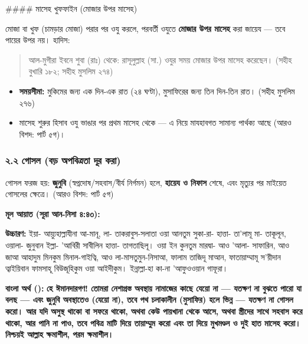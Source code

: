 \#\#\#\# মাসেহ খুফফাইন (মোজার উপর মাসেহ)

মোজা বা খুফ (চামড়ার মোজা) পরার পর ওযু করলে, পরবর্তী ওযুতে \textbf{মোজার উপর মাসেহ} করা জায়েয — তবে পায়ের উপর নয়। হাদিস:

\begin{quote}
আল-মুগীরা ইবনে শুবা (রাঃ) থেকে: রাসূলুল্লাহ (সা.) ওযুর সময় মোজার উপর মাসেহ করেছেন। (সহীহ বুখারি ১৮২; সহীহ মুসলিম ২৭৪)
\end{quote}

\begin{itemize}
\item \textbf{সময়সীমা:} মুকিমের জন্য এক দিন-এক রাত (২৪ ঘণ্টা), মুসাফিরের জন্য তিন দিন-তিন রাত। (সহীহ মুসলিম ২৭৬)
\item মাসেহ শুরুর হিসাব ওযু ভাঙার পর প্রথম মাসেহ থেকে — এ নিয়ে মাযহাবগত সামান্য পার্থক্য আছে (আরও বিশদ: পার্ট ৫গ)।
\end{itemize}
\subsubsection*{২.২ গোসল (বড় অপবিত্রতা দূর করা)}

গোসল ফরজ হয়: \textbf{জুনুবি} (স্বপ্নদোষ/সহবাস/বীর্য নির্গমন) হলে, \textbf{হায়েয ও নিফাস} শেষে, এবং মৃত্যুর পর মাইয়েত গোসলের ক্ষেত্রে। (আরও বিশদ: পার্ট ৫গ)

\textbf{মূল আয়াত (সূরা আন-নিসা ৪:৪৩):}

\begin{center}\end{center}

\textbf{উচ্চারণ:} ইয়া- আয়্যুহাল্লাযীনা আ-মানূ, লা- তাকরাবুস-সলাতা ওয়া আনতুম সুকা-রা- হাত্তা- তা'লামূ মা- তাকূলূন, ওয়ালা- জুনুবান ইল্লা- 'আবিরী সাবীলিন হাত্তা- তাগতাছিলূ। ওয়া ইন কুনতুম মারদ্বা- আও 'আলা- সাফারিন, আও জাআ আহাদুম মিনকুম মিনাল-গাইত্বি, আও লা-মাসতুমুন-নিসাআ, ফালাম তাজিদূ মাআন, ফাতায়াম্মামূ স'য়ীদান ত্বাইয়িবান ফামসাহূ বিউজূহিকুম ওয়া আইদীকুম। ইন্নাল্লা-হা কা-না 'আফুওওয়ান গাফূরা।

\textbf{বাংলা অর্থ ():}
\textbf{হে ঈমানদারগণ! তোমরা নেশাগ্রস্ত অবস্থায় নামাজের কাছে যেয়ো না — যতক্ষণ না বুঝতে পারো যা বলছ — এবং জুনুবি অবস্থাতেও (যেয়ো না), তবে পথ চলাকালীন (মুসাফির) হলে ভিন্ন — যতক্ষণ না গোসল করো। আর যদি অসুস্থ থাকো বা সফরে থাকো, অথবা কেউ পায়খানা থেকে আসে, অথবা স্ত্রীদের সাথে সহবাস করে থাকো, আর পানি না পাও, তবে পবিত্র মাটি দিয়ে তায়াম্মুম করো এবং তা দিয়ে মুখমণ্ডল ও দুই হাত মাসেহ করো। নিশ্চয়ই আল্লাহ ক্ষমাশীল, পরম ক্ষমাশীল।}

